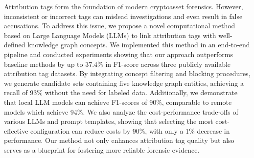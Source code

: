 Attribution tags form the foundation of modern cryptoasset forensics. However, inconsistent or incorrect tags can mislead investigations and even result in false accusations.
To address this issue, we propose a novel computational method based on Large Language Models (LLMs) to link attribution tags with well-defined knowledge graph concepts. We implemented this method in an end-to-end pipeline and conducted experiments showing that
our approach outperforms baseline methods by up to 37.4\% in F1-score across three publicly available attribution tag datasets. By integrating concept filtering and blocking procedures, we generate candidate sets containing five knowledge graph entities, achieving a recall of 93\% without the need for labeled data. Additionally, we demonstrate that local LLM models can achieve F1-scores of 90\%, comparable to remote models which achieve 94\%. We also analyze the cost-performance trade-offs of various LLMs and prompt templates, showing that selecting the most cost-effective configuration can reduce costs by 90\%, with only a 1\% decrease in performance.
Our method not only enhances attribution tag quality but also serves as a blueprint for fostering more reliable forensic evidence.